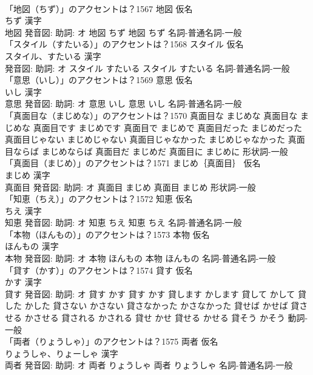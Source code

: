 \documentclass[8pt]{extreport}
\begin{document}
\begin{CJK}{UTF8}{min}
\\	「地図（ちず）」のアクセントは？1567	地図 仮名　
\\	ちず 漢字　
\\	地図 発音図: 助詞: オ	地図 ちず		地図 ちず				名詞-普通名詞-一般 
\\	「スタイル（すたいる）」のアクセントは？1568	スタイル 仮名　
\\	スタイル、すたいる 漢字　
\\	発音図: 助詞: オ	スタイル すたいる		スタイル すたいる				名詞-普通名詞-一般 
\\	「意思（いし）」のアクセントは？1569	意思 仮名　
\\	いし 漢字　
\\	意思 発音図: 助詞: オ	意思 いし		意思 いし				名詞-普通名詞-一般 
\\	「真面目な（まじめな）」のアクセントは？1570		真面目な まじめな		真面目な まじめな 真面目です まじめです 真面目で まじめで 真面目だった まじめだった 真面目じゃない まじめじゃない 真面目じゃなかった まじめじゃなかった 真面目ならば まじめならば 真面目だ まじめだ 真面目に まじめに				形状詞-一般 
\\	「真面目（まじめ）」のアクセントは？1571	まじめ｛真面目｝ 仮名　
\\	まじめ 漢字　
\\	真面目 発音図: 助詞: オ	真面目 まじめ		真面目 まじめ				形状詞-一般 
\\	「知恵（ちえ）」のアクセントは？1572	知恵 仮名　
\\	ちえ 漢字　
\\	知恵 発音図: 助詞: オ	知恵 ちえ		知恵 ちえ				名詞-普通名詞-一般 
\\	「本物（ほんもの）」のアクセントは？1573	本物 仮名　
\\	ほんもの 漢字　
\\	本物 発音図: 助詞: オ	本物 ほんもの		本物 ほんもの				名詞-普通名詞-一般 
\\	「貸す（かす）」のアクセントは？1574	貸す 仮名　
\\	かす 漢字　
\\	貸す 発音図: 助詞: オ	貸す かす		貸す かす 貸します かします 貸して かして 貸した かした 貸さない かさない 貸さなかった かさなかった 貸せば かせば 貸させる かさせる 貸される かされる 貸せ かせ 貸せる かせる 貸そう かそう				動詞-一般 
\\	「両者（りょうしゃ）」のアクセントは？1575	両者 仮名　
\\	りょうしゃ、りょーしゃ 漢字　
\\	両者 発音図: 助詞: オ	両者 りょうしゃ		両者 りょうしゃ				名詞-普通名詞-一般 

\end{CJK}
\end{document}
